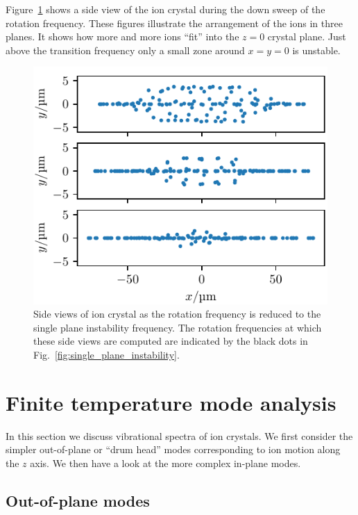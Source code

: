 \documentclass[aps, pra, preprint]{revtex4-1}
\begin{document}
Figure~\ref{fig:side_views_single_plane_instability} shows a side
view of the ion crystal during the down sweep of the rotation
frequency. These figures illustrate the arrangement of the ions
in three planes. It shows how more and more ions ``fit'' into the
$z=0$ crystal plane. Just above the transition frequency only a
small zone around $x=y=0$ is unstable.
\begin{figure}
  \includegraphics{./figures/fig_side_views_single_plane_instability.pdf}
  \caption{Side views of ion crystal as the rotation frequency is
    reduced to the single plane instability frequency. The
    rotation frequencies at which these side views are computed
    are indicated by the black dots in
    Fig.~\ref{fig:single_plane_instability}.}
  \label{fig:side_views_single_plane_instability}
\end{figure}


\section{Finite temperature mode analysis}

In this section we discuss vibrational spectra of ion crystals.
We first consider the simpler out-of-plane or ``drum head'' modes
corresponding to ion motion along the $z$ axis. We then have a
look at the more complex in-plane modes.


\subsection{Out-of-plane modes}
\end{document}

